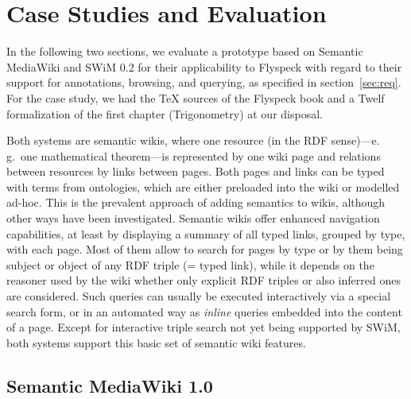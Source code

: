 \section{Case Studies and Evaluation}

In the following two sections, we evaluate a prototype based on Semantic
MediaWiki and SWiM 0.2 for their applicability to Flyspeck with regard to their
support for annotations, browsing, and querying, as specified in
section~\ref{sec:req}.  For the case study, we had the {\TeX} sources of the
Flyspeck book and a Twelf formalization of the first chapter (Trigonometry) at
our disposal.

Both systems are semantic wikis, where one resource (in the RDF sense)---e.\,g.\
one mathematical theorem---is represented by one wiki page and relations between
resources by links between pages.  Both pages and links can be typed with terms
from ontologies\cite{OrDeMoVoHa06:annotation-navigation-semwiki}, which are
either preloaded into the wiki or modelled
ad-hoc\cite{KrSchVr:semwiki-reasoning07}.  This is the prevalent approach of
adding semantics to wikis, although other ways have been
investigated\cite{semwiki06}.  Semantic wikis offer enhanced navigation
capabilities, at least by displaying a summary of all typed links, grouped by
type, with each page.  Most of them allow to search for pages by type or by them
being subject or object of any RDF triple (= typed link), while it depends on
the reasoner used by the wiki whether only explicit RDF triples or also inferred
ones are considered\cite{KrSchVr:semwiki-reasoning07}.  Such queries can usually
be executed interactively via a special search form, or in an automated way as
\emph{inline} queries embedded into the content of a page.  Except for
interactive triple search not yet being supported by SWiM, both systems support
this basic set of semantic wiki features.

\subsection{Semantic MediaWiki 1.0}
\label{sec:smw-study}

